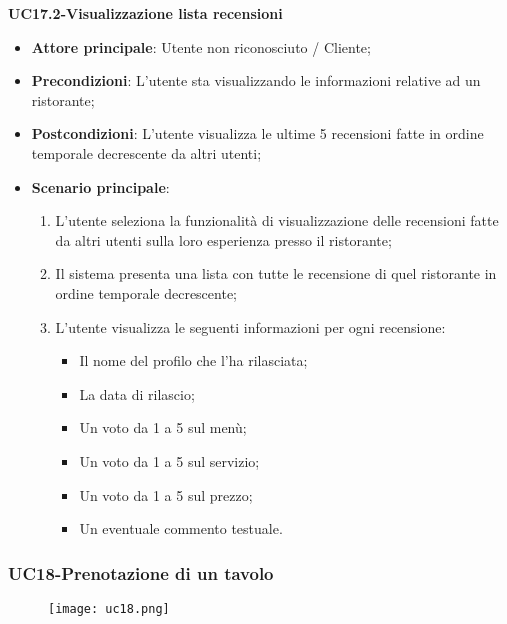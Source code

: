 \pagebreak
\textbf{UC17.2-Visualizzazione lista recensioni}

\begin{itemize}
\item \textbf{Attore principale}: Utente non riconosciuto / Cliente;
\item \textbf{Precondizioni}: L'utente sta visualizzando le informazioni relative ad un ristorante;
\item \textbf{Postcondizioni}: L'utente visualizza le ultime 5 recensioni fatte in ordine temporale decrescente da altri utenti;
\item \textbf{Scenario principale}:
\begin{enumerate}
\item L'utente seleziona la funzionalità di visualizzazione delle recensioni fatte da altri utenti sulla loro esperienza presso il ristorante;
\item Il sistema presenta una lista con tutte le recensione di quel ristorante in ordine temporale decrescente;
\item L'utente visualizza le seguenti informazioni per ogni recensione:
\begin{itemize}
\item Il nome del profilo che l'ha rilasciata;
\item La data di rilascio;
\item Un voto da 1 a 5 sul menù;
\item Un voto da 1 a 5 sul servizio;
\item Un voto da 1 a 5 sul prezzo;
\item Un eventuale commento testuale.
\end{itemize}
\end{enumerate}
\end{itemize}

\subsubsection{UC18-Prenotazione di un tavolo}
\begin{figure}[h] \texttt{[image: uc18.png]} \end{figure}

